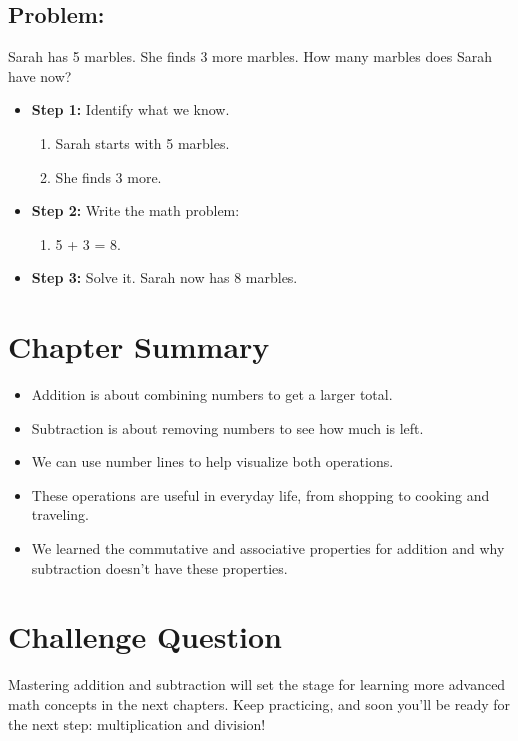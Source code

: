 \subsection{\textbf{Problem:}}
 Sarah has 5 marbles. She finds 3 more marbles. How many marbles does Sarah have now?
\begin{itemize}
  
    \item \textbf{Step 1:} Identify what we know.
    \begin{enumerate}[label=\alph*)]
        \item Sarah starts with 5 marbles.
        \item She finds 3 more.
    \end{enumerate}
    \item \textbf{Step 2:} Write the math problem:
    \begin{enumerate}[label=\alph*)]
        \item 5 + 3 = 8.
    \end{enumerate}
    \item \textbf{Step 3:} Solve it. Sarah now has 8 marbles.
\end{itemize}

\section{Chapter Summary}
\begin{itemize}
    \item Addition is about combining numbers to get a larger total.
    \item Subtraction is about removing numbers to see how much is left.
    \item We can use number lines to help visualize both operations.
    \item These operations are useful in everyday life, from shopping to cooking and traveling.
    \item We learned the commutative and associative properties for addition and why subtraction doesn’t have these properties.
\end{itemize}
\section{Challenge Question}
Mastering addition and subtraction will set the stage for learning more advanced math concepts in the next chapters. Keep practicing, and soon you’ll be ready for the next step: multiplication and division!

